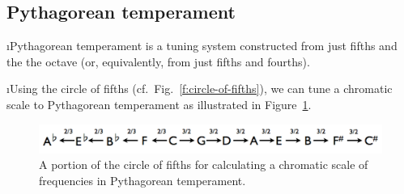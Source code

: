 \ei
\subsection{Pythagorean temperament}
\bi

\i Pythagorean temperament is a tuning system 
constructed from just fifths and the the octave
(or, equivalently, from just fifths and fourths).

\i Using the circle of fifths (cf.~Fig.~\ref{f:circle-of-fifths}),
we can tune
a chromatic scale to Pythagorean
temperament as illustrated in Figure~\ref{f:pythagorean-chromatic-scale}.
%
\begin{figure}[htbp]
\begin{center}
\includegraphics[width=\textwidth]{pythagorean-chromatic-scale}
\caption{A portion of the circle of fifths 
for calculating a chromatic scale of frequencies in Pythagorean temperament.}
\label{f:pythagorean-chromatic-scale}
\end{center}
\end{figure}
%

